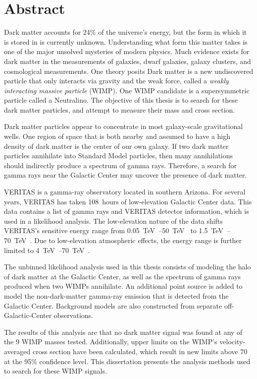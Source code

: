 \cleartooddpage[\thispagestyle{empty}]
\section*{Abstract}

Dark matter accounts for 24\% of the universe's energy, but the form in which it is stored in is currently unknown.
Understanding what form this matter takes is one of the major unsolved mysteries of modern physics.
Much evidence exists for dark matter in the measurements of galaxies, dwarf galaxies, galaxy clusters, and cosmological measurements.
One theory posits Dark matter is a new undiscovered particle that only interacts via gravity and the weak force, called a \textit{weakly interacting massive particle} (WIMP).
One WIMP candidate is a supersymmetric particle called a Neutralino.
The objective of this thesis is to search for these dark matter particles, and attempt to measure their mass and cross section.

Dark matter particles appear to concentrate in most galaxy-scale gravitational wells.
One region of space that is both nearby and assumed to have a high density of dark matter is the center of our own galaxy.
If two dark matter particles annihilate into Standard Model particles, then many annihilations should indirectly produce a spectrum of gamma rays.
Therefore, a search for gamma rays near the Galactic Center may uncover the presence of dark matter.

VERITAS is a gamma-ray observatory located in southern Arizona.
For several years, VERITAS has taken \SI{108}{hours} of low-elevation Galactic Center data.
This data contains a list of gamma rays and VERITAS detector information, which is used in a likelihood analysis.
The low-elevation nature of the data shifts VERITAS's sensitive energy range from \SIrange{0.05}{50}{\TeV{}} to \SIrange{1.5}{70}{\TeV{}}.
Due to low-elevation atmospheric effects, the energy range is further limited to \SIrange{4}{70}{\TeV{}}.

The unbinned likelihood analysis used in this thesis consists of modeling the halo of dark matter at the Galactic Center, as well as the spectrum of gamma rays produced when two WIMPs annihilate.
An additional point source is added to model the non-dark-matter gamma-ray emission that is detected from the Galactic Center.
Background models are also constructed from separate off-Galactic-Center observations.

The results of this analysis are that no dark matter signal was found at any of the 9 WIMP masses tested.
Additionally, upper limits on the WIMP's velocity-averaged cross section have been calculated, which result in new limits above \SI{70}{} at the 95\% confidence level.
This dissertation presents the analysis methods used to search for these WIMP signals.

